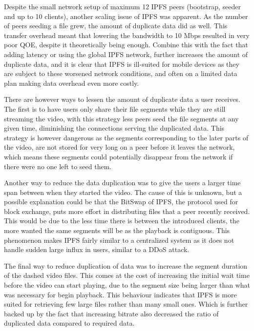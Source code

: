 Despite the small network setup of maximum 12 \ac{IPFS} peers (bootstrap, seeder and up to 10 clients), another scaling issue of \ac{IPFS} was apparent. As the number of peers seeding a file grew, the amount of duplicate data did as well. This transfer overhead meant that lowering the bandwidth to 10 \ac{Mbps} resulted in very poor \ac{QOE}, despite it theoretically being enough. Combine this with the fact that adding latency or using the global \ac{IPFS} network, further increases the amount of duplicate data, and it is clear that \ac{IPFS} is ill-suited for mobile devices as they are subject to these worsened network conditions, and often on a limited data plan making data overhead even more costly. 

There are however ways to lessen the amount of duplicate data a user receives.
The first is to have users only share their file segments while they are still streaming the video, with this strategy less peers seed the file segments at any given time, diminishing the connections serving the duplicated data. This strategy is however dangerous as the segments corresponding to the later parts of the video, are not stored for very long on a peer before it leaves the network, which means these segments could potentially disappear from the network if there were no one left to seed them. 

Another way to reduce the data duplication was to give the users a larger time span between when they started the video. The cause of this is unknown, but a possible explanation could be that the BitSwap of \ac{IPFS}, the protocol used for block exchange, puts more effort in distributing files that a peer recently received. This would be due to the less time there is between the introduced clients, the more wanted the same segments will be as the playback is contiguous.
This phenomenon makes \ac{IPFS} fairly similar to a centralized system as it does not handle sudden large influx in users, similar to a \acl{DDoS} attack.

The final way to reduce duplication of data was to increase the segment duration of the dashed video files. This comes at the cost of increasing the initial wait time before the video can start playing, due to the segment size being larger than what was necessary for begin playback. This behaviour indicates that \ac{IPFS} is more suited for retrieving few large files rather than many small ones. Which is further backed up by the fact that increasing bitrate also decreased the ratio of duplicated data compared to required data.

